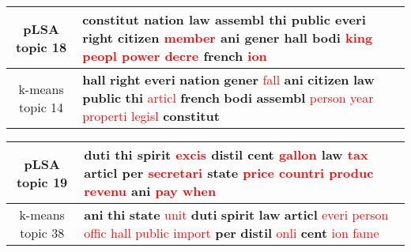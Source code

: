 \begin{center}\begin{tabularx}{\textwidth} {
  | c | >{\raggedright\arraybackslash}X | } \hline 
pLSA topic 18 & \textbf{constitut} \textbf{nation} \textbf{law} \textbf{assembl} \textbf{thi} \textbf{public} \textbf{everi} \textbf{right} \textbf{citizen} \textcolor{red}{member} \textbf{ani} \textbf{gener} \textbf{hall} \textbf{bodi} \textcolor{red}{king} \textcolor{red}{peopl} \textcolor{red}{power} \textcolor{red}{decre} \textbf{french} \textcolor{red}{ion} \\ \hline 
k-means topic 14 & \textbf{hall} \textbf{right} \textbf{everi} \textbf{nation} \textbf{gener} \textcolor{red}{fall} \textbf{ani} \textbf{citizen} \textbf{law} \textbf{public} \textbf{thi} \textcolor{red}{articl} \textbf{french} \textbf{bodi} \textbf{assembl} \textcolor{red}{person} \textcolor{red}{year} \textcolor{red}{properti} \textcolor{red}{legisl} \textbf{constitut} \\ \hline 
\end{tabularx}

\end{center}

\begin{center}\begin{tabularx}{\textwidth} {
  | c | >{\raggedright\arraybackslash}X | } \hline 
pLSA topic 19 & \textbf{duti} \textbf{thi} \textbf{spirit} \textcolor{red}{excis} \textbf{distil} \textbf{cent} \textcolor{red}{gallon} \textbf{law} \textcolor{red}{tax} \textbf{articl} \textbf{per} \textcolor{red}{secretari} \textbf{state} \textcolor{red}{price} \textcolor{red}{countri} \textcolor{red}{produc} \textcolor{red}{revenu} \textbf{ani} \textcolor{red}{pay} \textcolor{red}{when} \\ \hline 
k-means topic 38 & \textbf{ani} \textbf{thi} \textbf{state} \textcolor{red}{unit} \textbf{duti} \textbf{spirit} \textbf{law} \textbf{articl} \textcolor{red}{everi} \textcolor{red}{person} \textcolor{red}{offic} \textcolor{red}{hall} \textcolor{red}{public} \textcolor{red}{import} \textbf{per} \textbf{distil} \textcolor{red}{onli} \textbf{cent} \textcolor{red}{ion} \textcolor{red}{fame} \\ \hline 
\end{tabularx}

\end{center}

